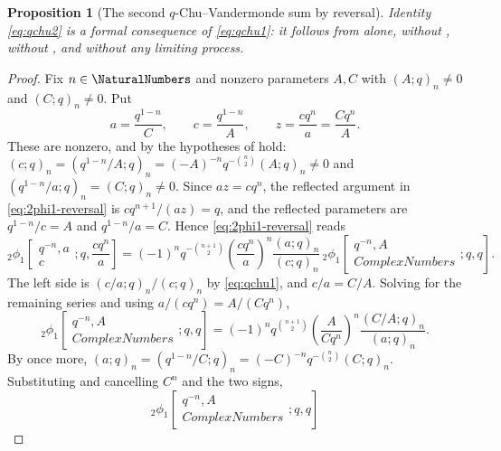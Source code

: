 \documentclass[11pt,a4paper,oneside,openany]{book}
\newtheorem{proposition}[proposition]{Proposition}
\theoremstyle{definition}
\theoremstyle{remark}
\begin{document}
\begin{proposition}[The second $q$-Chu--Vandermonde sum by reversal]\label{prop:qchu2-by-reversal}
Identity \eqref{eq:qchu2} is a formal consequence of \eqref{eq:qchu1}: it follows from  alone, without , without , and without any limiting process.
\end{proposition}

\begin{proof}
Fix $n\in\NaturalNumbers$ and nonzero parameters $A,C$ with $(A;q)_n\ne0$ and $(C;q)_n\ne0$.  Put
\[
 a=\frac{q^{1-n}}{C},\qquad
 c=\frac{q^{1-n}}{A},\qquad
 z=\frac{cq^{n}}{a}=\frac{Cq^{n}}{A}.
\]
These are nonzero, and by  the hypotheses of  hold: $(c;q)_n=(q^{1-n}/A;q)_n=(-A)^{-n}q^{-\binom n2}(A;q)_n\ne0$ and $(q^{1-n}/a;q)_n=(C;q)_n\ne0$.  Since $az=cq^{n}$, the reflected argument in \eqref{eq:2phi1-reversal} is $cq^{n+1}/(az)=q$, and the reflected parameters are $q^{1-n}/c=A$ and $q^{1-n}/a=C$.  Hence \eqref{eq:2phi1-reversal} reads
\[
 {}_2\phi_1\!\left[
 \begin{matrix}q^{-n},a\\c\end{matrix};q,\frac{cq^n}{a}\right]
 =(-1)^nq^{-\binom{n+1}{2}}
 \left(\frac{cq^{n}}{a}\right)^{n}
 \frac{(a;q)_n}{(c;q)_n}\,
 {}_2\phi_1\!\left[
 \begin{matrix}q^{-n},A\\ComplexNumbers\end{matrix};q,q\right].
\]
The left side is $(c/a;q)_n/(c;q)_n$ by \eqref{eq:qchu1}, and $c/a=C/A$.  Solving for the remaining series and using $a/(cq^{n})=A/(Cq^{n})$,
\[
 {}_2\phi_1\!\left[
 \begin{matrix}q^{-n},A\\ComplexNumbers\end{matrix};q,q\right]
 =(-1)^nq^{\binom{n+1}{2}}
 \left(\frac{A}{Cq^{n}}\right)^{n}
 \frac{(C/A;q)_n}{(a;q)_n}.
\]
By  once more, $(a;q)_n=(q^{1-n}/C;q)_n=(-C)^{-n}q^{-\binom n2}(C;q)_n$.  Substituting and cancelling $C^{n}$ and the two signs,
\[
 {}_2\phi_1\!\left[
 \begin{matrix}q^{-n},A\\ComplexNumbers\end{matrix};q,q\right]
\]
\end{proof}
\end{document}
